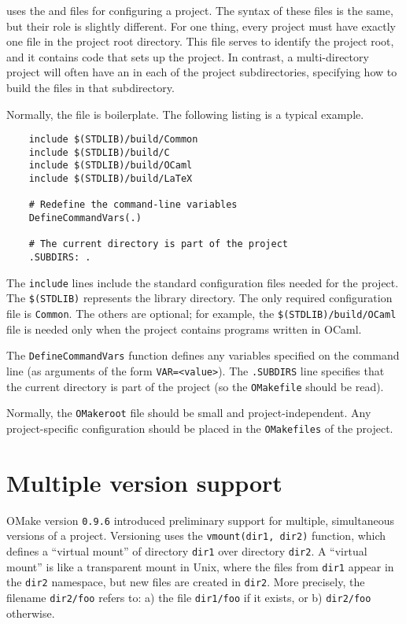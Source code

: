  uses the  and  files for configuring a project.  The
syntax of these files is the same, but their role is slightly different.  For one thing, every
project must have exactly one  file in the project root directory.  This file serves
to identify the project root, and it contains code that sets up the project.  In contrast, a
multi-directory project will often have an  in each of the project subdirectories,
specifying how to build the files in that subdirectory.

Normally, the  file is boilerplate.  The following listing is a typical example.

\begin{verbatim}
    include $(STDLIB)/build/Common
    include $(STDLIB)/build/C
    include $(STDLIB)/build/OCaml
    include $(STDLIB)/build/LaTeX

    # Redefine the command-line variables
    DefineCommandVars(.)

    # The current directory is part of the project
    .SUBDIRS: .
\end{verbatim}

The \verb+include+ lines include the standard configuration files needed for the project.  The
\verb+$(STDLIB)+ represents the  library directory.  The only required configuration
file is \verb+Common+.  The others are optional; for example, the \verb+$(STDLIB)/build/OCaml+ file
is needed only when the project contains programs written in OCaml.

The \verb+DefineCommandVars+ function defines any variables specified on the command line (as
arguments of the form \verb+VAR=<value>+).  The \verb+.SUBDIRS+ line specifies that the current
directory is part of the project (so the \verb+OMakefile+ should be read).

Normally, the \verb+OMakeroot+ file should be small and project-independent.  Any project-specific
configuration should be placed in the \verb+OMakefiles+ of the project.

\section{Multiple version support}

OMake version \verb+0.9.6+ introduced preliminary support for multiple, simultaneous versions of a
project.  Versioning uses the \verb+vmount(dir1, dir2)+ function, which defines a ``virtual mount''
of directory \verb+dir1+ over directory \verb+dir2+.  A ``virtual mount'' is like a transparent
mount in Unix, where the files from \verb+dir1+ appear in the \verb+dir2+ namespace, but new files
are created in \verb+dir2+.  More precisely, the filename \verb+dir2/foo+ refers to: a) the file
\verb+dir1/foo+ if it exists, or b) \verb+dir2/foo+ otherwise.


